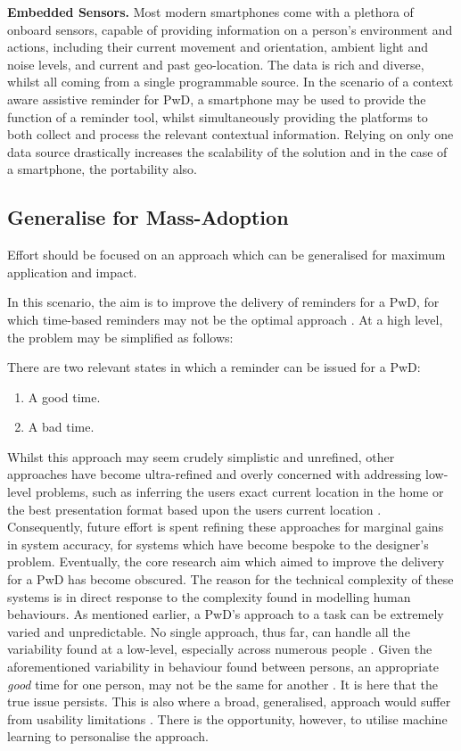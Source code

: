 \textbf{Embedded Sensors.}
Most modern smartphones come with a plethora of onboard sensors, capable of providing information on a person's environment and actions, including their current movement and orientation, ambient light and noise levels, and current and past geo-location. The data is rich and diverse, whilst all coming from a single programmable source. In the scenario of a context aware assistive reminder for PwD, a smartphone may be used to provide the function of a reminder tool, whilst simultaneously providing the platforms to both collect and process the relevant contextual information. Relying on only one data source drastically increases the scalability of the solution and in the case of a smartphone, the portability also.

\subsection{Generalise for Mass-Adoption}
Effort should be focused on an approach which can be generalised for maximum application and impact.

In this scenario, the aim is to improve the delivery of reminders for a PwD, for which time-based reminders may not be the optimal approach \cite{Morris2003, Zhou2012, Shulman2015}. At a high level, the problem may be simplified as follows:

There are two relevant states in which a reminder can be issued for a PwD:
\begin{enumerate}[noitemsep,topsep=0pt]
\item A good time.
\item A bad time.
\end{enumerate}

Whilst this approach may seem crudely simplistic and unrefined, other approaches have become ultra-refined and overly concerned with addressing low-level problems, such as inferring the users exact current location in the home \cite{Grunerbl2011} or the best presentation format based upon the users current location \cite{Tang2011}. Consequently, future effort is spent refining these approaches for marginal gains in system accuracy, for systems which have become bespoke to the designer's problem. Eventually, the core research aim which aimed to improve the delivery for a PwD has become obscured. The reason for the technical complexity of these systems is in direct response to the complexity found in modelling human behaviours.  As mentioned earlier, a PwD's approach to a task can be extremely varied and unpredictable. No single approach, thus far, can handle all the variability found at a low-level, especially across numerous people \cite{Chan2008}. Given the aforementioned variability in behaviour found between persons, an appropriate \textit{good} time for one person, may not be the same for another \cite{Fischer2012}. It is here that the true issue persists. This is also where a broad, generalised, approach would suffer from usability limitations \cite{Fischer2012}. There is the opportunity, however, to utilise machine learning to personalise the approach.

